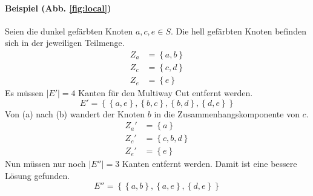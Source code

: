 \documentclass[a4paper]{scrartcl}
\begin{document}
\paragraph{Beispiel (Abb. \ref{fig:local})}
Seien die dunkel gefärbten Knoten $a, c, e \in S$.
Die hell gefärbten Knoten befinden sich in der jeweiligen Teilmenge.
\begin{equation}
    \begin{split}
        Z_a &= \left\{ a, b \right\} \\
        Z_c &= \left\{ c, d \right\} \\
        Z_e &= \left\{ e \right\}
    \end{split}
\end{equation}
Es müssen $|E'| = 4$ Kanten für den Multiway Cut entfernt werden.
\begin{equation}
    E' = \left\{ 
        \left\{ a, e \right\},
        \left\{ b, c \right\},
        \left\{ b, d \right\},
        \left\{ d, e \right\}
    \right\}
\end{equation}
Von (a) nach (b) wandert der Knoten $b$ in die Zusammenhangskomponente von $c$.
\begin{equation}
    \begin{split}
        Z_a' &= \left\{ a \right\} \\
        Z_c' &= \left\{ c, b, d \right\} \\
        Z_e' &= \left\{ e \right\}
    \end{split}
\end{equation}
Nun müssen nur noch $|E''| = 3$ Kanten entfernt werden.
Damit ist eine bessere Lösung gefunden.
\begin{equation}
    E'' = \left\{ 
        \left\{ a, b \right\},
        \left\{ a, e \right\},
        \left\{ d, e \right\}
    \right\}
\end{equation}
\end{document}

